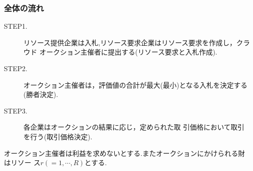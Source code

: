 \documentclass{ujarticle}
\begin{document}
\subsubsection{全体の流れ}
\begin{description}
\item [STEP1.] {リソース提供企業は入札,リソース要求企業はリソース要求を作成し，クラウド
    オークション主催者に提出する(リソース要求と入札作成).}
\item [STEP2.] {オークション主催者は，評価値の合計が最大(最小)となる入札を決定する(勝者決定).}
\item [STEP3.] {各企業はオークションの結果に応じ，定められた取 引価格において取引を行う(取引価格決定).}
\end{description}
オークション主催者は利益を求めないとする.またオークションにかけられる財はリソー
ス$r(=1,\cdots ,R)$とする.
\end{document}
